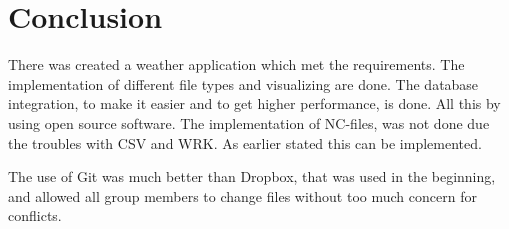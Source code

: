 \chapter{Conclusion}
There was created a weather application which met the requirements.
The implementation of different file types and visualizing are done. The database integration, to make it easier and to get higher performance, is done. All this by using open source software.
The implementation of NC-files, was not done due the troubles with CSV and WRK. As earlier stated this can be implemented.

The use of Git was much better than Dropbox, that was used in the beginning, and allowed all group members to change files without too much concern for conflicts. 